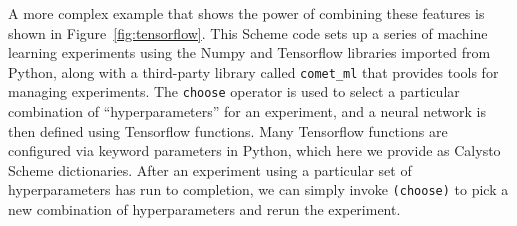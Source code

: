 \documentclass[acmsmall,screen,authorversion]{acmart}
\begin{document}
\noindent
A more complex example that shows the power of combining these features is
shown in Figure~\ref{fig:tensorflow}. This Scheme code sets up a series of
machine learning experiments using the Numpy and Tensorflow libraries imported
from Python, along with a third-party library called \texttt{comet\_ml} that
provides tools for managing experiments.  The \texttt{choose} operator is used
to select a particular combination of ``hyperparameters'' for an experiment,
and a neural network is then defined using Tensorflow functions.  Many
Tensorflow functions are configured via keyword parameters in Python, which
here we provide as Calysto Scheme dictionaries.  After an experiment using a
particular set of hyperparameters has run to completion, we can simply invoke
\texttt{(choose)} to pick a new combination of hyperparameters and rerun the
experiment.

\end{document}
